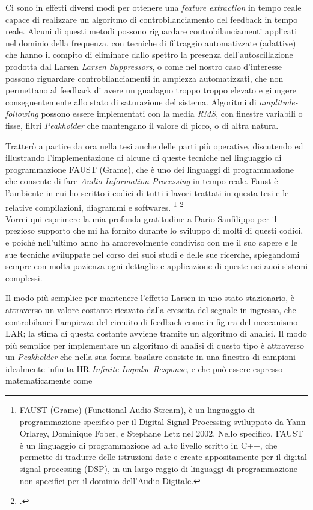 Ci sono in effetti diversi modi per ottenere una \textit{feature extraction} 
in tempo reale capace di realizzare un algoritmo di controbilanciamento 
del feedback in tempo reale.
Alcuni di questi metodi possono riguardare controbilanciamenti 
applicati nel dominio della frequenza,
con tecniche di filtraggio automatizzate (adattive) che
hanno il compito di eliminare dallo spettro la presenza dell'autoscillazione prodotta dal Larsen \textit{Larsen Suppressors},
o come nel nostro caso d’interesse possono riguardare controbilanciamenti in ampiezza
automatizzati, che non permettano al feedback di avere un guadagno troppo troppo elevato 
e giungere conseguentemente allo stato di saturazione del sistema.
Algoritmi di \textit{amplitude-following} possono essere implementati 
con la media \textit{RMS}, con finestre variabili o fisse, 
filtri \textit{Peakholder} che mantengano il valore di picco, o di altra natura.

Tratterò a partire da ora nella tesi anche delle parti più operative, 
discutendo ed illustrando l'implementazione
di alcune di queste tecniche nel linguaggio di programmazione FAUST (Grame), 
che è uno dei linguaggi di programmazione
che consente di fare \textit{Audio Information Processing} in tempo reale.
Faust è l'ambiente in cui ho scritto i codici di tutti i lavori trattati
in questa tesi e le relative compilazioni, diagrammi e softwares.
\footnote{FAUST (Grame) (Functional Audio Stream), 
è un linguaggio di programmazione specifico per il Digital Signal
Processing sviluppato da Yann Orlarey, Dominique Fober, e Stephane Letz nel
2002. Nello specifico, FAUST è un linguaggio di programmazione ad alto livello
scritto in C++, che permette di tradurre delle istruzioni date e create 
appositamente per il digital signal processing (DSP), in un largo raggio di linguaggi
di programmazione non specifici per il dominio dell’Audio Digitale.} \footcite{https://faust.grame.fr/} \\
Vorrei qui esprimere la mia profonda gratitudine a 
Dario Sanfilippo per il prezioso supporto che mi ha fornito durante 
lo sviluppo di molti di questi codici,
e poiché nell'ultimo anno ha amorevolmente condiviso con me il suo sapere e le sue tecniche 
sviluppate nel corso dei suoi studi e delle sue ricerche, 
spiegandomi sempre con molta pazienza ogni dettaglio e applicazione 
di queste nei auoi sistemi complessi.

Il modo più semplice per mantenere l’effetto Larsen in uno stato stazionario, è attraverso un
valore costante ricavato dalla crescita del segnale in ingresso,
che controbilanci l’ampiezza del circuito di feedback come in figura del meccanismo LAR;
la stima di questa costante avviene tramite un algoritmo di analisi.
Il modo più semplice per implementare un algoritmo di analisi di questo tipo
è attraverso un \textit{Peakholder} che nella sua forma basilare consiste in una finestra 
di campioni idealmente infinita IIR \textit{Infinite Impulse Response},
e che può essere espresso matematicamente come

